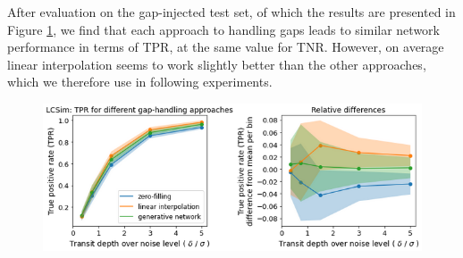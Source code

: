 After evaluation on the gap-injected test set, of which the results are presented in Figure \ref{fig:preprocessing-gaps_lcsim}, we find that each approach to handling gaps leads to similar network performance in terms of TPR, at the same value for TNR. However, on average linear interpolation seems to work slightly better than the other approaches, which we therefore use in following experiments.

\begin{figure}
    \centering
    \includegraphics[width=0.65\linewidth]{Experiments/Figures/Preprocessing/pp_gaps_lcsim.png}
    \caption{}
    \label{fig:preprocessing-gaps_lcsim}
\end{figure}